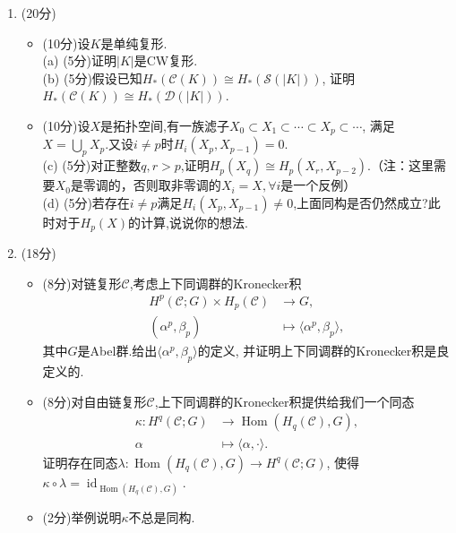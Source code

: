 \begin{enumerate}
\begin{itemize}
    \end{itemize}
    \item[四.] (20分)
    \begin{itemize}
        \item[1.] (10分)设$K$是单纯复形.\\
        (a) (5分)证明$|K|$是CW复形.\\
        (b) (5分)假设已知$H_*(\mathcal{C}(K))\cong H_*(\mathcal{S}(|K|))$,
        证明$H_*(\mathcal{C}(K))\cong H_*(\mathcal{D}(|K|))$.
        \item[2.] (10分)设$X$是拓扑空间,有一族滤子$X_0\subset X_1\subset\cdots\subset X_p\subset\cdots$,
        满足$X=\bigcup_pX_p$.又设$i\neq p$时$H_i(X_p,X_{p-1})=0$.\\
        (c) (5分)对正整数$q,r>p$,证明$H_p(X_q)\cong H_p(X_r,X_{p-2})$.（注：这里需要$X_0$是零调的，否则取非零调的$X_i = X, \forall i$是一个反例）\\
        (d) (5分)若存在$i\neq p$满足$H_i(X_p,X_{p-1})\neq0$,上面同构是否仍然成立?此时对于$H_p(X)$的计算,说说你的想法.
    \end{itemize}
    \item[五.] (18分)
    \begin{itemize}
        \item[1.] (8分)对链复形$\mathcal{C}$,考虑上下同调群的Kronecker积\[\begin{aligned}
        H^p(\mathcal{C};G)\times H_p(\mathcal{C})&\longrightarrow G,\\
        (\alpha^p,\beta_p)&\longmapsto\langle\alpha^p,\beta_p\rangle,
        \end{aligned}\]其中$G$是Abel群.给出$\langle\alpha^p,\beta_p\rangle$的定义,
        并证明上下同调群的Kronecker积是良定义的.
        \item[2.] (8分)对自由链复形$\mathcal{C}$,上下同调群的Kronecker积提供给我们一个同态\[\begin{aligned}
        \kappa:H^q(\mathcal{C};G)&\longrightarrow\operatorname{Hom}(H_q(\mathcal{C}),G),\\
        \alpha&\longmapsto\langle\alpha,\cdot\rangle.
        \end{aligned}\]证明存在同态$\lambda:\operatorname{Hom}(H_q(\mathcal{C}),G)\longrightarrow H^q(\mathcal{C};G)$,
        使得$\kappa\circ\lambda=\operatorname{id}_{\operatorname{Hom}(H_q(\mathcal{C}),G)}$.
        \item[3.] (2分)举例说明$\kappa$不总是同构.
    \end{itemize}
\end{enumerate}


